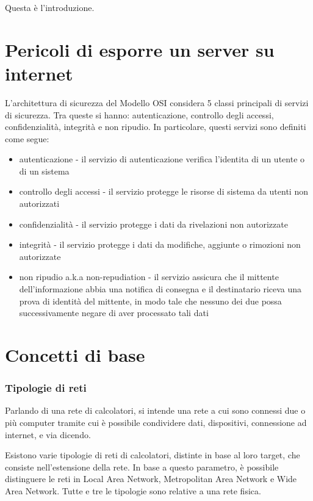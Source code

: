 Questa è l'introduzione.

\section{Pericoli di esporre un server su internet}

L'architettura di sicurezza del Modello OSI considera 5 classi principali di servizi di sicurezza. Tra queste si hanno: autenticazione, controllo degli accessi, confidenzialità, integrità e non ripudio.
In particolare, questi servizi sono definiti come segue:
\begin{itemize}
    \item autenticazione - il servizio di autenticazione verifica l'identita di un utente o di un sistema
    \item controllo degli accessi - il servizio protegge le risorse di sistema da utenti non autorizzati
    \item confidenzialità - il servizio protegge i dati da rivelazioni non autorizzate
    \item integrità - il servizio protegge i dati da modifiche, aggiunte o rimozioni non autorizzate
    \item non ripudio a.k.a non-repudiation - il servizio assicura che il mittente dell'informazione abbia una notifica di consegna e il destinatario riceva una prova di identità del mittente, in modo tale che nessuno dei due possa successivamente negare di aver processato tali dati
\end{itemize}


\section{Concetti di base}
\subsubsection{Tipologie di reti}
Parlando di una rete di calcolatori, si intende una rete a cui sono connessi due o più computer tramite cui è possibile condividere dati, dispositivi, connessione ad internet, e via dicendo.

Esistono varie tipologie di reti di calcolatori, distinte in base al loro target, che consiste nell'estensione della rete. In base a questo parametro, è possibile distinguere le reti in Local Area Network, Metropolitan Area Network e Wide Area Network. Tutte e tre le tipologie sono relative a una rete fisica.

